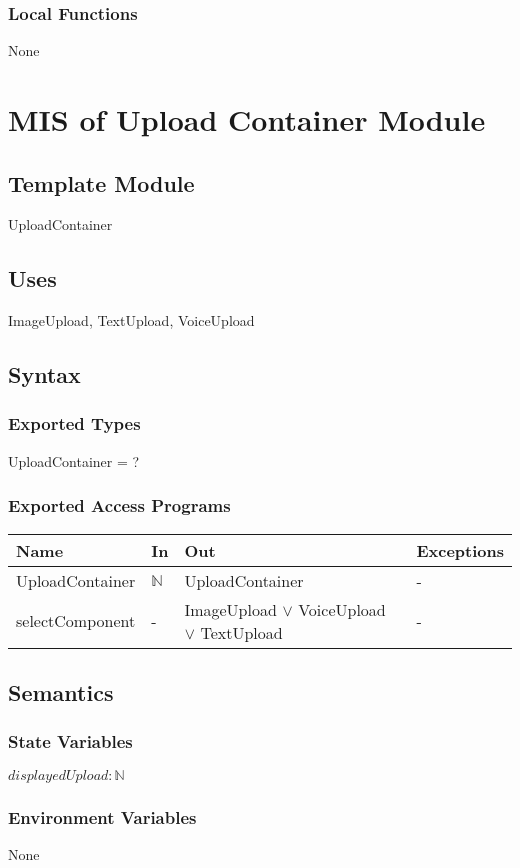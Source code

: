 \documentclass[12pt, titlepage]{article}
\begin{document}
\subsubsection{Local Functions}
None

\newpage

\section{MIS of Upload Container Module} \label{UploadContainer}
\subsection{Template Module}
UploadContainer
\subsection{Uses}
ImageUpload, TextUpload, VoiceUpload
\subsection{Syntax}
\subsubsection{Exported Types}
UploadContainer = ?
\subsubsection{Exported Access Programs}
\begin{center}
	\begin{tabular}{p{3cm} p{3cm} p{5cm} p{2cm}}
		\hline
		\textbf{Name} & \textbf{In} & \textbf{Out} & \textbf{Exceptions} \\
		\hline
		UploadContainer & $\mathbb{N}$ & UploadContainer & - \\
		selectComponent & - & ImageUpload $\lor$ VoiceUpload $\lor$ TextUpload 
		&-\\
		\hline
	\end{tabular}
\end{center}
\subsection{Semantics}
\subsubsection{State Variables}
$displayedUpload:\mathbb{N}$
\subsubsection{Environment Variables}
None
\end{document}
